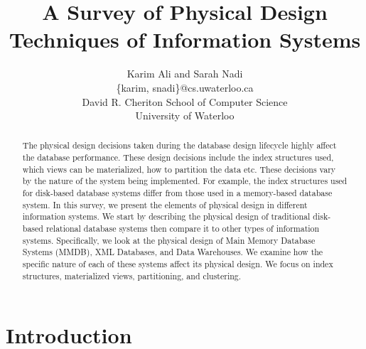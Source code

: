 \documentclass[12pt,a4paper]{article}
\begin{document}
\title{A Survey of Physical Design Techniques of Information Systems}


\author{Karim Ali and Sarah Nadi\\
\{karim, snadi\}@cs.uwaterloo.ca \\
David R. Cheriton School of Computer Science\\
University of Waterloo\\
}

\date{}
\maketitle



\begin{abstract}
The physical design decisions taken during the database design lifecycle highly affect the database performance. These design decisions include the index
structures used,
which views can be materialized, how to partition the data etc. These decisions vary by the nature of the system being implemented. For example, the index
structures used for disk-based database systems differ from those used in a memory-based database system. In this survey, we present the elements of
physical design in different information systems. We start by describing the physical design of traditional disk-based relational database systems then compare
it to other types of information systems. Specifically, we look at the physical design of Main Memory Database Systems (MMDB), XML Databases, and Data
Warehouses. We examine how the specific nature of each of these systems affect its physical design. We focus on index structures, materialized views,
partitioning, and clustering.
\end{abstract}

\section{Introduction}
\end{document}
